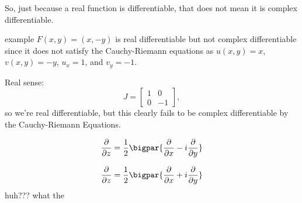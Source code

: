 \documentclass[class=article, crop=false]{standalone}
\begin{document}
 So, just because a real function is differentiable, that does not mean it is complex differentiable.

 \begin{understandingcheck}{example}
   $F(x,y) = (x,-y)$ is real differentiable but not complex differentiable since it does not satisfy the Cauchy-Riemann equations as $u(x,y)=x$, $v(x,y) = -y$, $u_x=1$, and $v_y=-1$.

   Real sense:
     \[
       J =
        \begin{bmatrix}
          1&0\\0&-1
        \end{bmatrix},
     \]
   so we're real differentiable, but this clearly fails to be complex differentiable by the Cauchy-Riemann Equations.
 \end{understandingcheck}

\begin{nota}

    \[
      \frac{\partial }{\partial z} = \frac{1}{2} \bigpar{\frac{\partial }{\partial x} - i \frac{\partial }{\partial y}}
    \]

      \[
        \frac{\partial }{\partial z}= \frac{1}{2} \bigpar{\frac{\partial }{\partial x} + i \frac{\partial }{\partial y}}
      \]
    huh??? what the
\end{nota}
\end{document}

